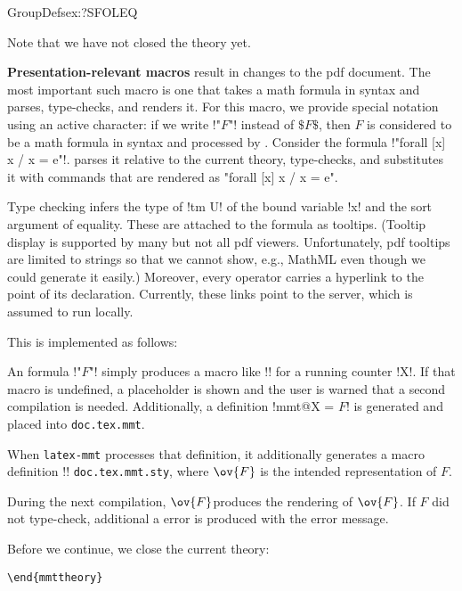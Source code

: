 \begin{mmttheory}{GroupDefs}{ex:?SFOLEQ}

\noindent
Note that we have not closed the theory yet.
\medskip

\textbf{Presentation-relevant macros} result in changes to the pdf document.
The most important such macro is one that takes a math formula in \mmt syntax and parses, type-checks, and renders it.
For this macro, we provide special notation using an active character:
if we write !"$F$"! instead of $\mathdollar F\mathdollar$, then $F$ is considered to be a math formula in \mmt syntax and processed by \mmt.
Consider the formula !"forall [x] x / x = e"!. \mmt parses it relative to the current theory, type-checks, and substitutes it with \latex commands that are rendered as "forall [x] x / x = e".

Type checking infers the type of !tm U! of the bound variable !x! and the sort argument of equality.
These are attached to the formula as tooltips.
(Tooltip display is supported by many but not all pdf viewers.
Unfortunately, pdf tooltips  are limited to strings so that we cannot show, e.g., MathML even though we could generate it easily.)
Moreover, every operator carries a hyperlink to the point of its declaration.
Currently, these links point to the \mmt server, which is assumed to run locally.
\medskip

This is implemented as follows:
\begin{compactenum}
 \item An \mmt formula !"$F$"! simply produces a macro like !\mmt@X! for a running counter !X!.
 If that macro is undefined, a placeholder is shown and the user is warned that a second compilation is needed.
 Additionally, a definition !mmt@X = $F$! is generated and placed into \texttt{doc.tex.mmt}.
 \item When \texttt{latex-mmt} processes that definition, it additionally generates a macro definition !\newcommand{\mmt@X}{$\ov{F}$}! \texttt{doc.tex.mmt.sty}, where $\ov{F}$ is the intended \latex representation of $F$.
 \item During the next compilation, \mmt@X produces the rendering of $\ov{F}$.
 If $F$ did not type-check, additional a \latex error is produced with the error message.
\end{compactenum}

\noindent
Before we continue, we close the current theory:
\end{mmttheory}
\begin{lstlisting}
\end{mmttheory}
\end{lstlisting}


